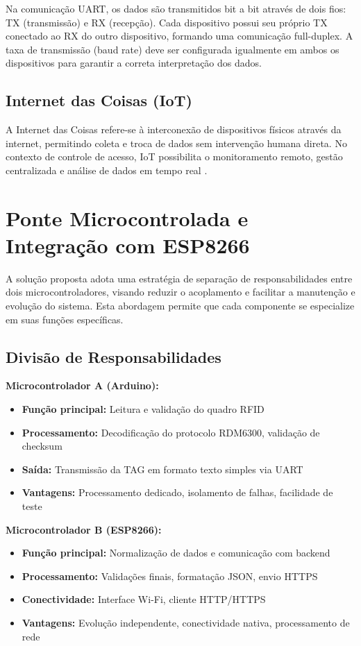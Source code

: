 Na comunicação UART, os dados são transmitidos bit a bit através de dois fios: TX (transmissão) e RX (recepção). Cada dispositivo possui seu próprio TX conectado ao RX do outro dispositivo, formando uma comunicação full-duplex. A taxa de transmissão (baud rate) deve ser configurada igualmente em ambos os dispositivos para garantir a correta interpretação dos dados.

\subsection{Internet das Coisas (IoT)}

A Internet das Coisas refere-se à interconexão de dispositivos físicos através da internet, permitindo coleta e troca de dados sem intervenção humana direta. No contexto de controle de acesso, IoT possibilita o monitoramento remoto, gestão centralizada e análise de dados em tempo real \cite{embarcados-serial}.

\section{Ponte Microcontrolada e Integração com ESP8266}
\label{sec:ponte-microcontrolada}

A solução proposta adota uma estratégia de separação de responsabilidades entre dois microcontroladores, visando reduzir o acoplamento e facilitar a manutenção e evolução do sistema. Esta abordagem permite que cada componente se especialize em suas funções específicas.

\subsection{Divisão de Responsabilidades}

\textbf{Microcontrolador A (Arduino):}
\begin{itemize}
\item \textbf{Função principal:} Leitura e validação do quadro RFID
\item \textbf{Processamento:} Decodificação do protocolo RDM6300, validação de checksum
\item \textbf{Saída:} Transmissão da TAG em formato texto simples via UART
\item \textbf{Vantagens:} Processamento dedicado, isolamento de falhas, facilidade de teste
\end{itemize}

\textbf{Microcontrolador B (ESP8266):}
\begin{itemize}
\item \textbf{Função principal:} Normalização de dados e comunicação com backend
\item \textbf{Processamento:} Validações finais, formatação JSON, envio HTTPS
\item \textbf{Conectividade:} Interface Wi-Fi, cliente HTTP/HTTPS
\item \textbf{Vantagens:} Evolução independente, conectividade nativa, processamento de rede
\end{itemize}


